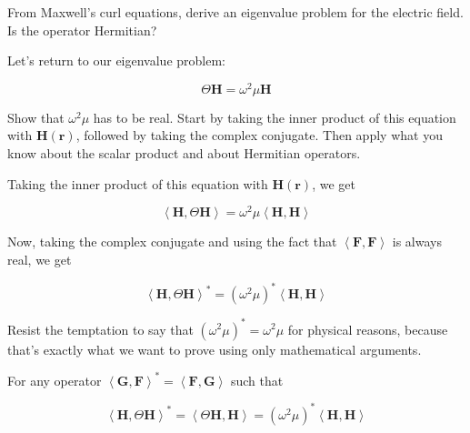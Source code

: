 \begin{exer}
From Maxwell's curl equations, derive an eigenvalue problem for the electric field. Is the operator Hermitian?
\end{exer}

\pagebreak

\label{week8}


Let's return to our eigenvalue problem:

\begin{equation}
\Theta {\mathbf H} = \omega^2 \mu {\mathbf H}
\end{equation} 

\begin{cue}
Show that $\omega^2 \mu$ has to be real. Start by taking the inner product of this equation with ${\mathbf H({\mathbf r})}$, followed by taking the complex conjugate. Then apply what you know about the scalar product and about Hermitian operators.    
\end{cue}

Taking the inner product of this equation with ${\mathbf H({\mathbf r})}$, we get

\begin{equation}
\left\langle{\mathbf H} , \Theta {\mathbf H}\right\rangle  = \omega^2 \mu \left\langle {\mathbf H} , {\mathbf H}\right\rangle \label{eq-real-eigen-1}
\end{equation}

Now, taking the complex conjugate and using the fact that $\left\langle {\mathbf F}, {\mathbf F}\right\rangle$ is always real, we get

\begin{equation}
\left\langle{\mathbf H} , \Theta {\mathbf H}\right\rangle^*  = (\omega^2 \mu)^* \left\langle {\mathbf H} , {\mathbf H}\right\rangle 
\end{equation} 

Resist the temptation to say that $(\omega^2 \mu)^*= \omega^2 \mu $ for physical reasons, because that's exactly what we want to prove using only mathematical arguments.

For any operator $\left\langle {\mathbf G}, {\mathbf F}\right\rangle ^*  = \left\langle {\mathbf F}, {\mathbf G}\right\rangle$ such that

\begin{equation}
\left\langle{\mathbf H} , \Theta {\mathbf H}\right\rangle^* = \left\langle \Theta {\mathbf H} , {\mathbf H} \right\rangle  = (\omega^2 \mu)^* \left\langle {\mathbf H} , {\mathbf H}\right\rangle 
\end{equation} 

